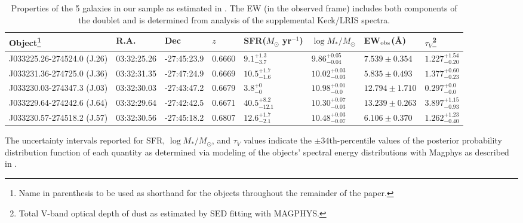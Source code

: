 \documentclass[twocolumn]{aastex61}
\begin{document}
\begin{table}[t]
\centering
\caption{Properties of the 5 galaxies in our sample as estimated in \cite{Rubin_2014}. The EW (in the observed frame) includes both components of the  doublet and is 
determined from analysis of the supplemental Keck/LRIS spectra.}
\begin{tabular}{llllllll} \hline \hline
Object\footnote{ Name in parenthesis to be used as shorthand for the objects throughout the remainder of the paper. } & R.A. & Dec  & $z$ & SFR($M_{\odot}$ yr$^{-1}$) & $\log{M_{*}/M_{\odot}}$ & EW$_{\rm{obs}}$(\AA) & $\tau_V$\footnote{ Total V-band optical depth of dust as estimated by SED fitting with MAGPHYS. }\smallskip      \\ \hline 
J033225.26-274524.0 (J.26)      & 03:32:25.26 & -27:45:23.9 & 0.6660 & $9.1_{-3.7}^{+1.3}$& $9.86_{-0.04}^{+0.05}$ & $7.539\pm 0.354$ &  $1.227_{-0.20}^{+1.54}$\\ 

J033231.36-274725.0 (J.36)      & 03:32:31.35 & -27:47:24.9 &   0.6669 & $10.5_{-1.6}^{+1.7}$ & $10.02_{-0.03}^{+0.03}$&$5.835 \pm 0.493$ & $1.377_{-0.23}^{+0.60}$\\

J033230.03-274347.3  (J.03)     & 03:32:30.03 & -27:43:47.2  &   0.6679 & $3.8_{-0}^{+0}$ & $10.98_{-0.0}^{+0.01}$ &$12.794 \pm 1.710$ & $0.297_{-0.0}^{+0.0}$ \\

J033229.64-274242.6  (J.64)    & 03:32:29.64 & -27:42:42.5 & 0.6671 & $40.5_{-12.1}^{+8.2}$ & $10.30_{-0.03}^{+0.07}$ &$13.239 \pm 0.263$ & $3.897_{-0.93}^{+1.15}$\\

J033230.57-274518.2  (J.57)    & 03:32:30.56 & -27:45:18.2 &   0.6807  & $12.6_{-2.1}^{+1.7}$ & $10.48_{-0.07}^{+0.03}$ &$6.106 \pm 0.370$ & $1.262_{-0.40}^{+1.23}$ \\

\hline 
\end{tabular}
\begin{tablenotes}
\small
\item The uncertainty intervals reported for SFR, $\log M_*/M_{\odot}$, and $\tau_V$ values indicate the $\pm34$th-percentile values of the posterior probability distribution function of each quantity as determined via modeling of the objects' spectral energy distributions with Magphys \citep{duCunha2008} as described in \citet{Rubin_2014}.
\end{tablenotes}
\label{tab:prop}
\end{table}
\end{document}
